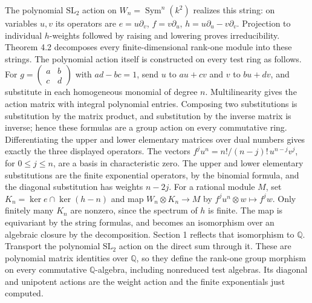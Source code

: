 \documentclass[11pt,a4paper,openany]{report}
\begin{document}
The polynomial \(\mathrm{SL}_2\) action on \(W_n=\operatorname{Sym}^n(k^2)\) realizes this string: on variables \(u,v\) its operators are \(e=u\partial_v\), \(f=v\partial_u\), \(h=u\partial_u-v\partial_v\). Projection to individual \(h\)-weights followed by raising and lowering proves irreducibility. Theorem 4.2 decomposes every finite-dimensional rank-one module into these strings. The polynomial action itself is constructed on every test ring as follows. For \(g=\left(\begin{smallmatrix}a&b\\c&d\end{smallmatrix}\right)\) with \(ad-bc=1\), send \(u\) to \(au+cv\) and \(v\) to \(bu+dv\), and substitute in each homogeneous monomial of degree \(n\). Multilinearity gives the action matrix with integral polynomial entries. Composing two substitutions is substitution by the matrix product, and substitution by the inverse matrix is inverse; hence these formulas are a group action on every commutative ring. Differentiating the upper and lower elementary matrices over dual numbers gives exactly the three displayed operators. The vectors \(f^j u^n=n!/(n-j)!\,u^{n-j}v^j\), for \(0\le j\le n\), are a basis in characteristic zero. The upper and lower elementary substitutions are the finite exponential operators, by the binomial formula, and the diagonal substitution has weights \(n-2j\). For a rational module \(M\), set \(K_n=\ker e\cap\ker(h-n)\) and map \(W_n\otimes K_n\to M\) by \(f^j u^n\otimes w\mapsto f^jw\). Only finitely many \(K_n\) are nonzero, since the spectrum of \(h\) is finite. The map is equivariant by the string formulas, and becomes an isomorphism over an algebraic closure by the decomposition. Section 1 reflects that isomorphism to \(\mathbb Q\). Transport the polynomial \(\mathrm{SL}_2\) action on the direct sum through it. These are polynomial matrix identities over \(\mathbb Q\), so they define the rank-one group morphism on every commutative \(\mathbb Q\)-algebra, including nonreduced test algebras. Its diagonal and unipotent actions are the weight action and the finite exponentials just computed.
\end{document}
